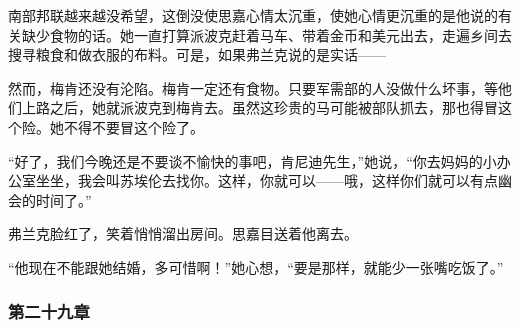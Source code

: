 \par 南部邦联越来越没希望，这倒没使思嘉心情太沉重，使她心情更沉重的是他说的有关缺少食物的话。她一直打算派波克赶着马车、带着金币和美元出去，走遍乡间去搜寻粮食和做衣服的布料。可是，如果弗兰克说的是实话——
\par 然而，梅肯还没有沦陷。梅肯一定还有食物。只要军需部的人没做什么坏事，等他们上路之后，她就派波克到梅肯去。虽然这珍贵的马可能被部队抓去，那也得冒这个险。她不得不要冒这个险了。
\par “好了，我们今晚还是不要谈不愉快的事吧，肯尼迪先生，”她说，“你去妈妈的小办公室坐坐，我会叫苏埃伦去找你。这样，你就可以——哦，这样你们就可以有点幽会的时间了。”
\par 弗兰克脸红了，笑着悄悄溜出房间。思嘉目送着他离去。
\par “他现在不能跟她结婚，多可惜啊！”她心想，“要是那样，就能少一张嘴吃饭了。”

\subsubsection{第二十九章}

